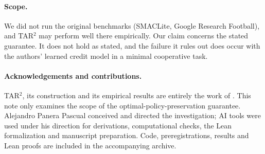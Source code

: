 \documentclass[11pt]{article}
\theoremstyle{remark}
\begin{document}
\paragraph{Scope.} We did not run the original benchmarks (SMACLite, Google Research Football), and TAR$^2$ may perform well there empirically. Our claim concerns the stated guarantee. It does not hold as stated, and the failure it rules out does occur with the authors' learned credit model in a minimal cooperative task.

\paragraph{Acknowledgements and contributions.} TAR$^2$, its construction and its empirical results are entirely the work of \citet{kapoor2024tar2,kapoor2025tar2}. This note only examines the scope of the optimal-policy-preservation guarantee. Alejandro Panera Pascual conceived and directed the investigation; AI tools were used under his direction for derivations, computational checks, the Lean formalization and manuscript preparation. Code, preregistrations, results and Lean proofs are included in the accompanying archive.
\end{document}
